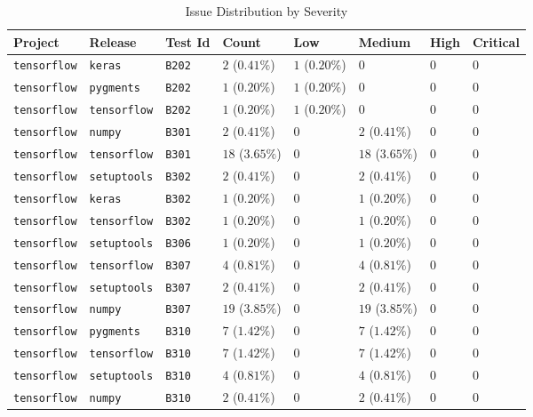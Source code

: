 \begin{table}
\caption{Issue Distribution by Severity}
\label{tab:issue-distribution}
\begin{tabular}{llllllll}
\toprule
Project & Release & Test Id & Count & Low & Medium & High & Critical \\
\midrule
\texttt{tensorflow} & \texttt{keras} & \texttt{B202} & $2$ ($0.41\%$) & $1$ ($0.20\%$) & $0$ & $0$ & $0$ \\
\texttt{tensorflow} & \texttt{pygments} & \texttt{B202} & $1$ ($0.20\%$) & $1$ ($0.20\%$) & $0$ & $0$ & $0$ \\
\texttt{tensorflow} & \texttt{tensorflow} & \texttt{B202} & $1$ ($0.20\%$) & $1$ ($0.20\%$) & $0$ & $0$ & $0$ \\
\texttt{tensorflow} & \texttt{numpy} & \texttt{B301} & $2$ ($0.41\%$) & $0$ & $2$ ($0.41\%$) & $0$ & $0$ \\
\texttt{tensorflow} & \texttt{tensorflow} & \texttt{B301} & $18$ ($3.65\%$) & $0$ & $18$ ($3.65\%$) & $0$ & $0$ \\
\texttt{tensorflow} & \texttt{setuptools} & \texttt{B302} & $2$ ($0.41\%$) & $0$ & $2$ ($0.41\%$) & $0$ & $0$ \\
\texttt{tensorflow} & \texttt{keras} & \texttt{B302} & $1$ ($0.20\%$) & $0$ & $1$ ($0.20\%$) & $0$ & $0$ \\
\texttt{tensorflow} & \texttt{tensorflow} & \texttt{B302} & $1$ ($0.20\%$) & $0$ & $1$ ($0.20\%$) & $0$ & $0$ \\
\texttt{tensorflow} & \texttt{setuptools} & \texttt{B306} & $1$ ($0.20\%$) & $0$ & $1$ ($0.20\%$) & $0$ & $0$ \\
\texttt{tensorflow} & \texttt{tensorflow} & \texttt{B307} & $4$ ($0.81\%$) & $0$ & $4$ ($0.81\%$) & $0$ & $0$ \\
\texttt{tensorflow} & \texttt{setuptools} & \texttt{B307} & $2$ ($0.41\%$) & $0$ & $2$ ($0.41\%$) & $0$ & $0$ \\
\texttt{tensorflow} & \texttt{numpy} & \texttt{B307} & $19$ ($3.85\%$) & $0$ & $19$ ($3.85\%$) & $0$ & $0$ \\
\texttt{tensorflow} & \texttt{pygments} & \texttt{B310} & $7$ ($1.42\%$) & $0$ & $7$ ($1.42\%$) & $0$ & $0$ \\
\texttt{tensorflow} & \texttt{tensorflow} & \texttt{B310} & $7$ ($1.42\%$) & $0$ & $7$ ($1.42\%$) & $0$ & $0$ \\
\texttt{tensorflow} & \texttt{setuptools} & \texttt{B310} & $4$ ($0.81\%$) & $0$ & $4$ ($0.81\%$) & $0$ & $0$ \\
\texttt{tensorflow} & \texttt{numpy} & \texttt{B310} & $2$ ($0.41\%$) & $0$ & $2$ ($0.41\%$) & $0$ & $0$ \\

\end{tabular}
\end{table}
